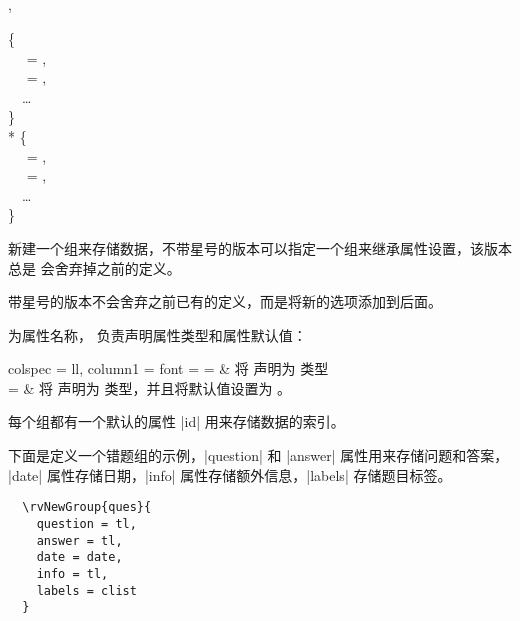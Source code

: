 \documentclass[full]{l3doc}
\begin{document}
\begin{documentation}
\subsection{}
\begin{function}{\rvNewGroup, \rvNewGroup*}
  \begin{syntax}
       \{ \\
    ~~ = , \\
    ~~ = , \\
    ~~\ldots{} \\
    \} \\
    *  \{ \\
    ~~ = , \\
    ~~ = , \\
    ~~\ldots{} \\
    \} \\
  \end{syntax}

\end{function}

  新建一个组来存储数据，不带星号的版本可以指定一个组来继承属性设置，该版本总是
  会舍弃掉之前的定义。

  带星号的版本不会舍弃之前已有的定义，而是将新的选项添加到后面。

   为属性名称， 负责声明属性类型和属性默认值：

  \noindent\begin{tblr}{
    colspec = {ll},
    column{1} = {font = \ttfamily}
  }
     =  &
    将  声明为  类型 \\
     = \textbar{} &
    将  声明为  类型，并且将默认值设置为 。
    \\
  \end{tblr}

  \begin{note}
    每个组都有一个默认的属性 |id| 用来存储数据的索引。
  \end{note}

  下面是定义一个错题组的示例，|question| 和 |answer| 属性用来存储问题和答案，
  |date| 属性存储日期，|info| 属性存储额外信息，|labels| 存储题目标签。
\begin{verbatim}
  \rvNewGroup{ques}{
    question = tl,
    answer = tl,
    date = date,
    info = tl,
    labels = clist
  }
\end{verbatim}


\end{documentation}
\end{document}
